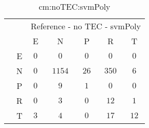 \begin{table}[!ht]
	\centering
	\begin{tabular}{|c|c|c|c|c|c|c|}
		\cline{3-7}
		\multicolumn{2}{c|}{} & \multicolumn{5}{|c|}{Reference - no TEC - svmPoly} \\ \cline{3-7}
		\multicolumn{2}{c|}{} & E & N & P & R & T \\ \hline
		\multirow{5}{*}{\rotatebox{90}{Prediction}} & E & $0$ & $0$ & $0$ & $0$ & $0$ \\ \cline{2-7}
		 & N & $0$ & $1154$ & $26$ & $350$ & $6$ \\ \cline{2-7}
		 & P & $0$ & $9$ & $1$ & $0$ & $0$ \\ \cline{2-7}
		 & R & $0$ & $3$ & $0$ & $12$ & $1$ \\ \cline{2-7}
		 & T & $3$ & $4$ & $0$ & $17$ & $12$ \\ \hline
	\end{tabular}
	\caption{cm:noTEC:svmPoly}
	\label{tab:cm:noTEC:svmPoly}
\end{table}
